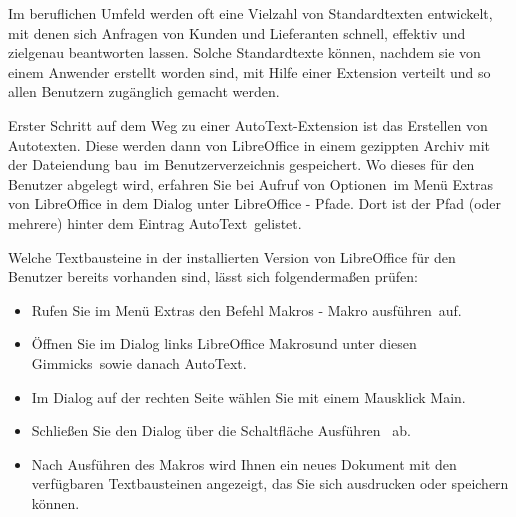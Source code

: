\documentclass[a4paper,10pt,pagesize,titlepage]{scrbook}
\begin{document}
Im beruflichen Umfeld werden oft eine Vielzahl von Standardtexten entwickelt, mit denen sich Anfragen von Kunden und Lieferanten schnell, effektiv und zielgenau beantworten lassen. Solche Standardtexte können, nachdem sie von einem Anwender erstellt worden sind, mit Hilfe einer Extension verteilt und so allen Benutzern zugänglich gemacht werden.

Erster Schritt auf dem Weg zu einer AutoText-Extension ist das Erstellen von Autotexten. Diese werden dann von LibreOffice in einem gezippten Archiv mit der Dateiendung \glqq bau\grqq~im Benutzerverzeichnis gespeichert. Wo dieses für den Benutzer abgelegt wird, erfahren Sie bei Aufruf von \glqq Optionen\grqq~im Menü Extras von LibreOffice in dem Dialog unter \glqq LibreOffice - Pfade\grqq. Dort ist der Pfad (oder mehrere) hinter dem Eintrag \glqq AutoText\grqq~gelistet.

Welche Textbausteine in der installierten Version von LibreOffice für den Benutzer bereits vorhanden sind, lässt sich folgendermaßen prüfen:
\begin{itemize}
	\item Rufen Sie im Menü Extras den Befehl \glqq Makros - Makro ausführen\grqq~auf.
	\item Öffnen Sie im Dialog links \glqq LibreOffice Makros\grqq und unter diesen \glqq Gimmicks\grqq~sowie danach \glqq AutoText\grqq.
	\item Im Dialog auf der rechten Seite wählen Sie mit einem Mausklick \glqq Main\grqq.
	\item Schließen Sie den Dialog über die Schaltfläche \glqq Ausführen\grqq~ ab.
	\item Nach Ausführen des Makros wird Ihnen ein neues Dokument mit den verfügbaren Textbausteinen angezeigt, das Sie sich ausdrucken oder speichern können.
\end{itemize}
\end{document}
